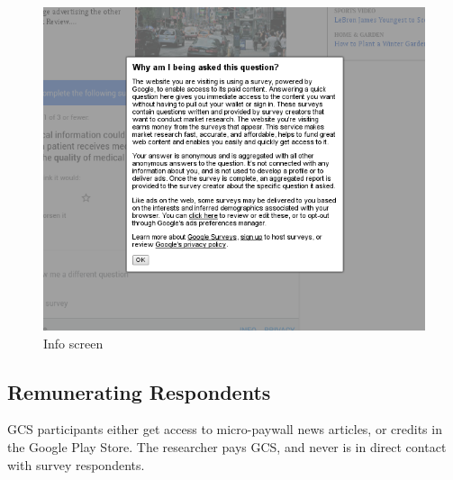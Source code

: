 \begin{figure}
	\includegraphics{Selection_365.png}
	\caption{\label{fig:info}Info screen}
\end{figure}


\subsection{Remunerating Respondents}
\ac{GCS} participants either get access to micro-paywall news articles, or credits in the Google Play Store. The researcher pays \ac{GCS}, and never is in direct contact with survey respondents.